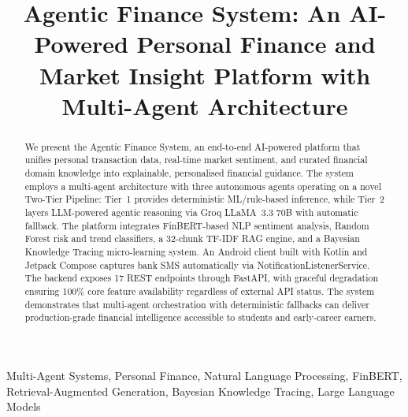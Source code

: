 \documentclass[conference]{IEEEtran}
\begin{document}
\title{Agentic Finance System: An AI-Powered Personal Finance and Market Insight Platform with Multi-Agent Architecture}

\author{
\and
{}
\and
{}
\and
{}
\and
{}
}

\maketitle

\begin{abstract}
We present the Agentic Finance System, an end-to-end AI-powered platform that unifies personal transaction data, real-time market sentiment, and curated financial domain knowledge into explainable, personalised financial guidance. The system employs a multi-agent architecture with three autonomous agents operating on a novel Two-Tier Pipeline: Tier~1 provides deterministic ML/rule-based inference, while Tier~2 layers LLM-powered agentic reasoning via Groq LLaMA~3.3 70B with automatic fallback. The platform integrates FinBERT-based NLP sentiment analysis, Random Forest risk and trend classifiers, a 32-chunk TF-IDF RAG engine, and a Bayesian Knowledge Tracing micro-learning system. An Android client built with Kotlin and Jetpack Compose captures bank SMS automatically via NotificationListenerService. The backend exposes 17 REST endpoints through FastAPI, with graceful degradation ensuring 100\% core feature availability regardless of external API status. The system demonstrates that multi-agent orchestration with deterministic fallbacks can deliver production-grade financial intelligence accessible to students and early-career earners.
\end{abstract}

\begin{IEEEkeywords}
Multi-Agent Systems, Personal Finance, Natural Language Processing, FinBERT, Retrieval-Augmented Generation, Bayesian Knowledge Tracing, Large Language Models
\end{IEEEkeywords}
\end{document}
